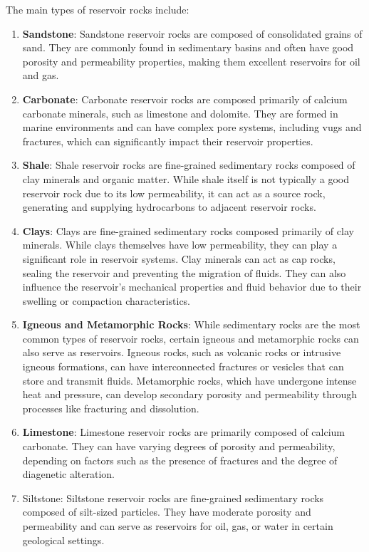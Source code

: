 \documentclass{article}
\begin{document}
The main types of reservoir rocks include:
\begin{enumerate}
    \item \textbf{Sandstone}: Sandstone reservoir rocks are composed of consolidated grains of sand. They are commonly found in sedimentary basins and often have good porosity and permeability properties, making them excellent reservoirs for oil and gas.
    \item \textbf{Carbonate}: Carbonate reservoir rocks are composed primarily of calcium carbonate minerals, such as limestone and dolomite. They are formed in marine environments and can have complex pore systems, including vugs and fractures, which can significantly impact their reservoir properties.
    \item \textbf{Shale}: Shale reservoir rocks are fine-grained sedimentary rocks composed of clay minerals and organic matter. While shale itself is not typically a good reservoir rock due to its low permeability, it can act as a source rock, generating and supplying hydrocarbons to adjacent reservoir rocks.
    \item \textbf{Clays}: Clays are fine-grained sedimentary rocks composed primarily of clay minerals. While clays themselves have low permeability, they can play a significant role in reservoir systems. Clay minerals can act as cap rocks, sealing the reservoir and preventing the migration of fluids. They can also influence the reservoir's mechanical properties and fluid behavior due to their swelling or compaction characteristics.
    \item \textbf{Igneous and Metamorphic Rocks}: While sedimentary rocks are the most common types of reservoir rocks, certain igneous and metamorphic rocks can also serve as reservoirs. Igneous rocks, such as volcanic rocks or intrusive igneous formations, can have interconnected fractures or vesicles that can store and transmit fluids. Metamorphic rocks, which have undergone intense heat and pressure, can develop secondary porosity and permeability through processes like fracturing and dissolution.
    \item \textbf{Limestone}: Limestone reservoir rocks are primarily composed of calcium carbonate. They can have varying degrees of porosity and permeability, depending on factors such as the presence of fractures and the degree of diagenetic alteration.
    \item Siltstone: Siltstone reservoir rocks are fine-grained sedimentary rocks composed of silt-sized particles. They have moderate porosity and permeability and can serve as reservoirs for oil, gas, or water in certain geological settings.
\end{enumerate}
\end{document}
